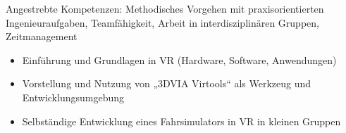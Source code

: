 \begin{module}
\begin{learningoutcomes}
Angestrebte Kompetenzen: \newline
 Methodisches Vorgehen mit praxisorientierten Ingenieuraufgaben, Teamfähigkeit, Arbeit in interdisziplinären Gruppen, Zeitmanagement


\end{learningoutcomes}

\begin{content}
\begin{itemize}\item Einführung und Grundlagen in VR (Hardware, Software, Anwendungen)  \item Vorstellung und Nutzung von „3DVIA Virtools“ als Werkzeug und Entwicklungsumgebung  \item Selbständige Entwicklung eines Fahrsimulators in VR in kleinen Gruppen  \end{itemize}
\end{content}



\end{module}


